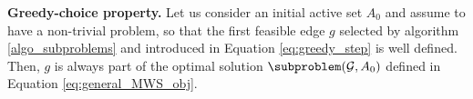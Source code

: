 

\begin{theorem} \label{theo:greedy_choice}
\textbf{Greedy-choice property.}
Let us consider an initial active set $A_0$ and assume to have a non-trivial problem, so that the first feasible edge $g$ selected by algorithm \ref{algo_subproblems} and introduced in Equation \ref{eq:greedy_step} is well defined. Then, $g$ is always part of the optimal solution $\subproblem(\mathcal{G},A_0)$ defined in Equation \ref{eq:general_MWS_obj}.
\end{theorem}


